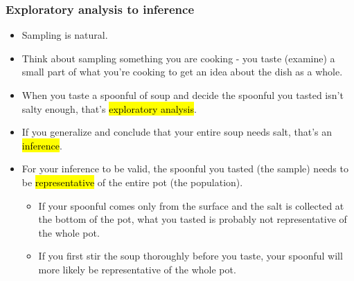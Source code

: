 
\begin{frame}
\frametitle{Exploratory analysis to inference}

\begin{itemize}

\item Sampling is natural.

\pause

\item Think about sampling something you are cooking - you taste (examine) a small part of what you're cooking to get an idea about the dish as a whole.

\pause

\item When you taste a spoonful of soup and decide the spoonful you tasted isn't salty enough, that's \hl{exploratory analysis}.

\pause

\item If you generalize and conclude that your entire soup needs salt, that's an \hl{inference}.

\pause

\item For your inference to be valid, the spoonful you tasted (the sample) needs to be \hl{representative} of the entire pot (the population).

\begin{itemize}
\item If your spoonful comes only from the surface and the salt is collected at the bottom of the pot, what you tasted is probably not representative of the whole pot.
\item If you first stir the soup thoroughly before you taste, your spoonful will more likely be representative of the whole pot.
\end{itemize}

\end{itemize}

\end{frame}


